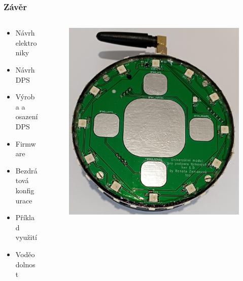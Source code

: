 \documentclass[%
  12pt,       				%
	t,                  %
	aspectratio=1610,   %
	unicode,						%
]{beamer}				    	%
\begin{document}
\begin{frame} 
	\frametitle{Závěr}

	\begin{center}
		\begin{columns}[T] 								%
			\begin{column}{0.3\textwidth}		%
				\begin{itemize}
					\item Návrh elektroniky
					\item Návrh DPS
					\item Výroba a osazení DPS
					\item Firmware 
					\item Bezdrátová konfigurace
					\item Příklad využití 
					\item Voděodolnost
				\end{itemize}
			\end{column}
			\begin{column}{0.7\textwidth}		%
				\begin{figure}
					\centering
					\includegraphics[width=0.65\columnwidth]{obrazky/v_krabicce.jpg}
				\end{figure}
			\end{column}
		\end{columns}	
	\end{center}
	
\end{frame}
\end{document}
